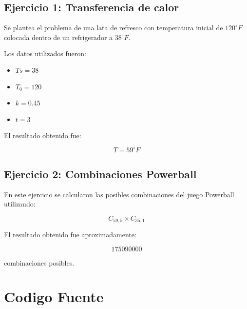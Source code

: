 \documentclass[12pt]{article}
\begin{document}
\subsection{Ejercicio 1: Transferencia de calor}

Se plantea el problema de una lata de refresco con temperatura inicial de $120^\circ F$ colocada dentro de un refrigerador a $38^\circ F$.

Los datos utilizados fueron:

\begin{itemize}
\item $Ts = 38$
\item $T_0 = 120$
\item $k = 0.45$
\item $t = 3$
\end{itemize}

El resultado obtenido fue:

\[
T = 59^\circ F
\]

\subsection{Ejercicio 2: Combinaciones Powerball}

En este ejercicio se calcularon las posibles combinaciones del juego Powerball utilizando:

\[
C_{59,5} \times C_{35,1}
\]

El resultado obtenido fue aproximadamente:

\[
175090000
\]

combinaciones posibles.


\section{Codigo Fuente}
\end{document}
